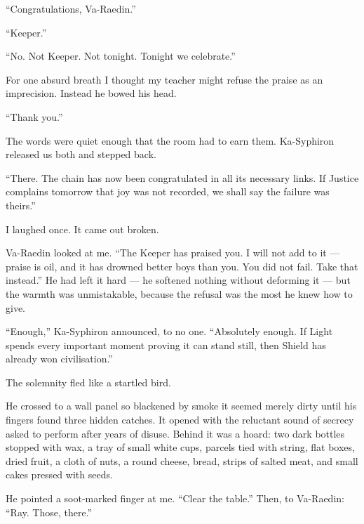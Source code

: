 ``Congratulations, Va-Raedin.''\par

``Keeper.''\par

``No. Not Keeper. Not tonight. Tonight we celebrate.''\par

For one absurd breath I thought my teacher might refuse the praise as an imprecision.
Instead he bowed his head.\par

``Thank you.''\par

The words were quiet enough that the room had to earn them.
Ka-Syphiron released us both and stepped back.\par

``There. The chain has now been congratulated in all its necessary links. If Justice complains tomorrow that joy was not recorded, we shall say the failure was theirs.''\par

I laughed once. It came out broken.\par

Va-Raedin looked at me. ``The Keeper has praised you. I will not add to it --- praise is oil, and it has drowned better boys than you. You did not fail. Take that instead.''
He had left it hard --- he softened nothing without deforming it --- but the warmth was unmistakable, because the refusal was the most he knew how to give.\par

``Enough,'' Ka-Syphiron announced, to no one.
``Absolutely enough. If Light spends every important moment proving it can stand still, then Shield has already won civilisation.''\par

The solemnity fled like a startled bird.\par

He crossed to a wall panel so blackened by smoke it seemed merely dirty until his fingers found three hidden catches.
It opened with the reluctant sound of secrecy asked to perform after years of disuse. Behind it was a hoard: two dark bottles stopped with wax, a tray of small white cups, parcels tied with string, flat boxes, dried fruit, a cloth of nuts, a round cheese, bread, strips of salted meat, and small cakes pressed with seeds.\par

He pointed a soot-marked finger at me. ``Clear the table.'' Then, to Va-Raedin: ``Ray. Those, there.''\par

